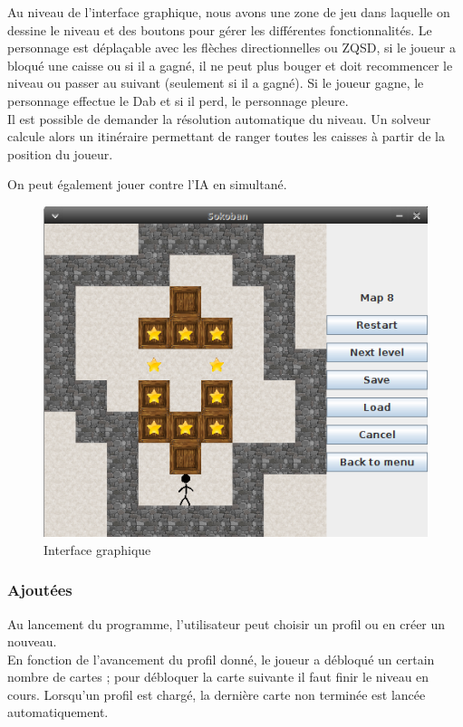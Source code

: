 \documentclass[a4paper,12pt]{article} %
\begin{document}
Au niveau de l'interface graphique, nous avons une zone de jeu dans laquelle on dessine le niveau et des boutons pour gérer les différentes fonctionnalités. Le personnage est déplaçable avec les flèches directionnelles ou ZQSD, si le joueur a bloqué une caisse ou si il a gagné, il ne peut plus bouger et doit recommencer le niveau ou passer au suivant (seulement si il a gagné). Si le joueur gagne, le personnage effectue le Dab et si il perd, le personnage pleure.\\

Il est possible de demander la résolution automatique du niveau. Un solveur calcule alors un itinéraire permettant de ranger toutes les caisses à partir de la position du joueur.

On peut également jouer contre l'IA en simultané.

\begin{figure}[!h]
\centering
\includegraphics[scale=0.5]{images/Capture2.png}
\caption{Interface graphique}
\end{figure}

\subsubsection*{Ajoutées}

Au lancement du programme, l'utilisateur peut choisir un profil ou en créer un nouveau.\\
En fonction de l'avancement du profil donné, le joueur a débloqué un certain nombre de cartes ; pour débloquer la carte suivante il faut finir le niveau en cours. Lorsqu'un profil est chargé, la dernière carte non terminée est lancée automatiquement.\\
\end{document}
